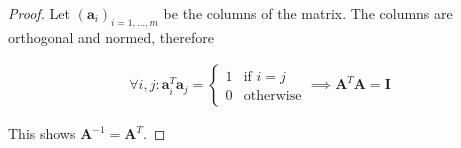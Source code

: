 \begin{proof}
	Let $(\mathbf{a}_i)_{i=1,...,m}$ be the columns of the matrix. The columns are orthogonal and normed, therefore
	
	\begin{align*}
		\forall i,j: \mathbf{a}_i^T\mathbf{a}_j = \begin{cases}
			1 & \text{if } i=j\\
			0 & \text{otherwise}
		\end{cases} \implies \mathbf{A}^T\mathbf{A} = \mathbf{I}
	\end{align*}
	
	This shows $\mathbf{A}^{-1} = \mathbf{A}^T$.
\end{proof}